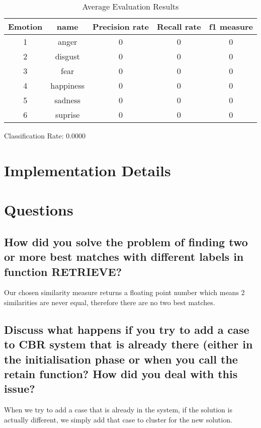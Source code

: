 \documentclass[11pt]{article}
\begin{document}
\begin{table}[H]
\caption{Average Evaluation Results} %
\centering %
\begin{tabular}{c c c c c} %
\hline\hline %
Emotion & name & Precision rate & Recall rate & f1 measure\\ [0.5ex] %
\hline %
1 & anger     & 0 & 0 & 0\\ %
2 & disgust   & 0 & 0 & 0\\
3 & fear      & 0 & 0 & 0\\
4 & happiness & 0 & 0 & 0\\
5 & sadness   & 0 & 0 & 0\\ 
6 & suprise   & 0 & 0 & 0\\ [1ex] %
\hline %
\end{tabular}
\label{table:sixevaluation} %
\end{table}

Classification Rate: 0.0000


\section{Implementation Details}
\section{Questions}

\subsection{How did you solve the problem of finding two or more best matches with different labels in function RETRIEVE?}

Our chosen similarity measure returns a floating point number which means 2 similarities are 
never equal, therefore there are no two best matches.

\subsection{Discuss what happens if you try to add a case to CBR system that is already there (either in the initialisation phase or when you call the retain function? How did you deal with this issue?}

When we try to add a case that is already in the system, if the solution is actually different,
we simply add that case to cluster for the new solution. 
\end{document}
